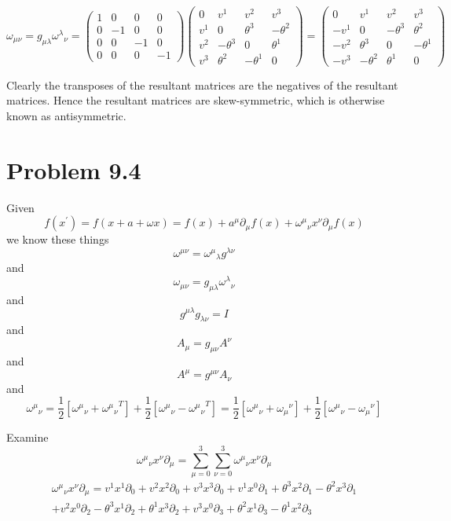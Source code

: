 \documentclass{article}
\begin{document}
\[\omega_{\mu\nu}=g_{\mu\lambda}{\omega^\lambda}_\nu =\begin{pmatrix}1&0&0&0\\0&-1&0&0\\0&0&-1&0\\0&0&0&-1\end{pmatrix}
\begin{pmatrix}0&v^1&v^2&v^3\\v^1&0&\theta^3&-\theta^2\\v^2&-\theta^3&0&\theta^1\\v^3&\theta^2&-\theta^1&0\end{pmatrix}=
\begin{pmatrix}0&v^1&v^2&v^3\\-v^1&0&-\theta^3&\theta^2\\-v^2&\theta^3&0&-\theta^1\\-v^3&-\theta^2&\theta^1&0\end{pmatrix}\]

Clearly the transposes of the resultant matrices are the negatives of the resultant matrices. Hence the resultant matrices are skew-symmetric, which is otherwise known as antisymmetric.


 
\section*{Problem 9.4}

Given \[ f(x^\prime) = f(x+a+\omega x) = f(x)+a^\mu \partial_\mu f(x)+{\omega^\mu}_\nu x^\nu \partial_\mu f(x)\] we know these things \[\omega^{\mu\nu}={\omega^\mu}_\lambda g^{\lambda\nu} \] and \[\omega_{\mu\nu}= g_{\mu\lambda} {\omega^\lambda}_\nu \] and \[g^{\mu\lambda}g_{\lambda\nu} = I\] and \[A_\mu=g_{\mu\nu}A^\nu\] and \[A^\mu=g^{\mu\nu}A_\nu\] and \[{\omega^\mu}_\nu=\frac{1}{2}[{\omega^\mu}_\nu+{{\omega^\mu}_\nu}^T]+\frac{1}{2}[{\omega^\mu}_\nu-{{\omega^\mu}_\nu}^T]=\frac{1}{2}[{\omega^\mu}_\nu+{\omega_\mu}^\nu]+\frac{1}{2}[{\omega^\mu}_\nu-{\omega_\mu}^\nu]\]

Examine \[{\omega^\mu}_\nu x^\nu \partial_\mu=\sum^3_{\mu=0}\sum^3_{\nu=0}{\omega^\mu}_\nu x^\nu \partial_\mu\]
\begin{multline*}
{\omega^\mu}_\nu x^\nu \partial_\mu=
v^1 x^1 \partial_0+v^2 x^2 \partial_0+v^3 x^3 \partial_0+
v^1 x^0 \partial_1+\theta^3 x^2 \partial_1-\theta^2 x^3 \partial_1\\+ 
v^2 x^0 \partial_2-\theta^3 x^1 \partial_2+\theta^1 x^3 \partial_2+
v^3 x^0 \partial_3+\theta^2 x^1 \partial_3-\theta^1 x^2 \partial_3
\end{multline*}
\end{document}
